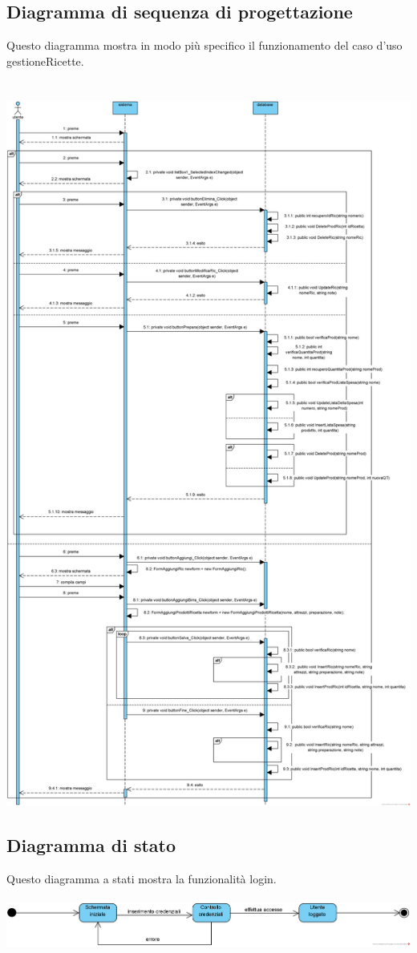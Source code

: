 \documentclass[a4paper, titlepage]{article}
\begin{document}
\subsection{Diagramma di sequenza di progettazione}
Questo diagramma mostra in modo più specifico il funzionamento del caso d'uso gestioneRicette.\\\\\
\includegraphics[scale=0.43]{Immagini/Sequence Diagram gestioneRicette.png}
\subsection{Diagramma di stato}
Questo diagramma a stati mostra la funzionalità login.\\\\
\includegraphics[scale=0.60]{Immagini/State Machine Diagram Login_Brew Day!.png}
\end{document}
